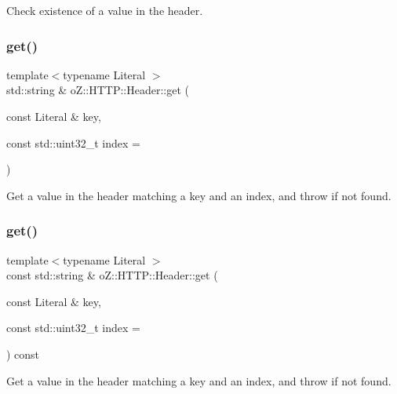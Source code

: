 Check existence of a value in the header. 

\mbox{\label{classo_z_1_1_h_t_t_p_1_1_header_ad09c489218fdd63493dd5ce7b025265e}} 
\subsubsection{\texorpdfstring{get()}{get()}\hspace{0.1cm}{\footnotesize\ttfamily [1/2]}}
{\footnotesize\ttfamily template$<$typename Literal $>$ \\
std\+::string \& o\+Z\+::\+H\+T\+T\+P\+::\+Header\+::get (\begin{DoxyParamCaption}\item[{const Literal \&}]{key,  }\item[{const std\+::uint32\+\_\+t}]{index = {} }\end{DoxyParamCaption})}



Get a value in the header matching a key and an index, and throw if not found. 

\mbox{\label{classo_z_1_1_h_t_t_p_1_1_header_abad6705f4eff158eec13825b3419d265}} 
\subsubsection{\texorpdfstring{get()}{get()}\hspace{0.1cm}{\footnotesize\ttfamily [2/2]}}
{\footnotesize\ttfamily template$<$typename Literal $>$ \\
const std\+::string \& o\+Z\+::\+H\+T\+T\+P\+::\+Header\+::get (\begin{DoxyParamCaption}\item[{const Literal \&}]{key,  }\item[{const std\+::uint32\+\_\+t}]{index = {} }\end{DoxyParamCaption}) const}



Get a value in the header matching a key and an index, and throw if not found. 

\mbox{\label{classo_z_1_1_h_t_t_p_1_1_header_ae20764876b35b2185394eafcb007454b}} 

